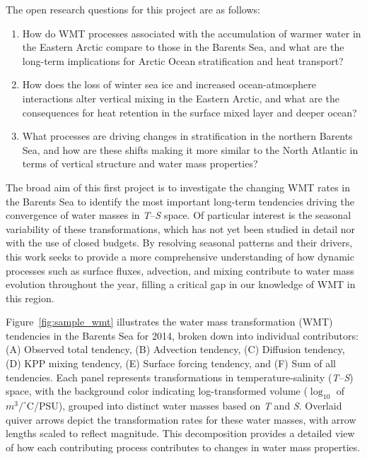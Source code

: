 \documentclass[draft]{agujournal2019}
\begin{document}
The open research questions for this project are as follows:
\begin{enumerate}
    \item How do WMT processes associated with the accumulation of warmer water in the Eastern Arctic compare to those in the Barents Sea, and what are the long-term implications for Arctic Ocean stratification and heat transport?
    \item How does the loss of winter sea ice and increased ocean-atmosphere interactions alter vertical mixing in the Eastern Arctic, and what are the consequences for heat retention in the surface mixed layer and deeper ocean?
    \item What processes are driving changes in stratification in the northern Barents Sea, and how are these shifts making it more similar to the North Atlantic in terms of vertical structure and water mass properties?
\end{enumerate}


The broad aim of this first project is to investigate the changing WMT rates in the Barents Sea to identify the most important long-term tendencies driving the convergence of water masses in \emph{T}--\emph{S} space. Of particular interest is the seasonal variability of these transformations, which has not yet been studied in detail nor with the use of closed budgets. By resolving seasonal patterns and their drivers, this work seeks to provide a more comprehensive understanding of how dynamic processes such as surface fluxes, advection, and mixing contribute to water mass evolution throughout the year, filling a critical gap in our knowledge of WMT in this region.


Figure~\ref{fig:sample_wmt} illustrates the water mass transformation (WMT) tendencies in the Barents Sea for 2014, broken down into individual contributors: (A) Observed total tendency, (B) Advection tendency, (C) Diffusion tendency, (D) KPP mixing tendency, (E) Surface forcing tendency, and (F) Sum of all tendencies. Each panel represents transformations in temperature-salinity (\emph{T}--\emph{S}) space, with the background color indicating log-transformed volume ($\log_{10}$ of $m^3/^\circ$C/PSU), grouped into distinct water masses based on \emph{T} and \emph{S}. Overlaid quiver arrows depict the transformation rates for these water masses, with arrow lengths scaled to reflect magnitude. This decomposition provides a detailed view of how each contributing process contributes to changes in water mass properties.
\end{document}
